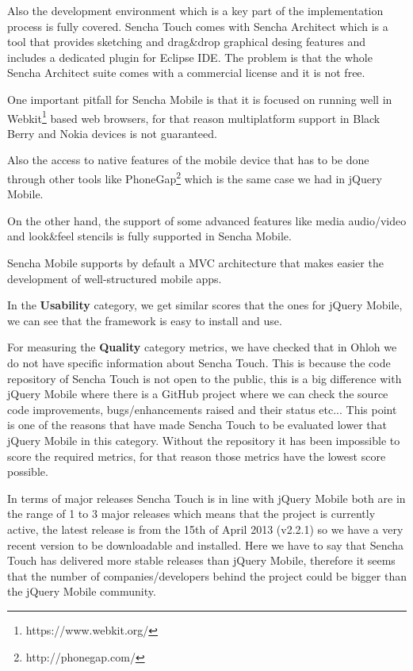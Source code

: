 \documentclass[a4paper,12pt]{book}
\begin{document}
Also the development environment which is a key part of the implementation process is fully covered. Sencha Touch comes with Sencha Architect\cite{sencha Architect} which is a tool that provides sketching and drag\&drop graphical desing features and includes a dedicated plugin for Eclipse IDE\cite{sencha Eclipse Plugin}. The problem is that the whole Sencha Architect suite comes with a commercial license and it is not free.

One important pitfall for Sencha Mobile is that it is focused on running well in Webkit\footnote{https://www.webkit.org/}  based web browsers, for that reason multiplatform support in Black Berry and Nokia devices is not guaranteed.

Also the access to native features of the mobile device that has to be done through other tools like PhoneGap\footnote{http://phonegap.com/} which is the same case we had in jQuery Mobile. 

On the other hand, the support of some advanced features like media audio/video and look\&feel stencils is fully supported in Sencha Mobile.

Sencha Mobile supports by default a MVC architecture\cite{sencha MVC}  that makes easier the development of well-structured mobile apps.

In the \textbf{Usability} category, we get similar scores that the ones for jQuery Mobile, we can see that the framework is easy to install and use.

For measuring the \textbf{Quality} category metrics, we have checked that in Ohloh we do not have specific information about Sencha Touch\cite{Ohloh Sencha Touch}. This is because the code repository of Sencha Touch is not open to the public, this is a big difference with jQuery Mobile where there is a GitHub project where we can check the source code improvements, bugs/enhancements raised and their status etc... This point is one of the reasons that have made Sencha Touch to be evaluated lower that jQuery Mobile in this category. Without the repository it has been impossible to score the required metrics, for that reason those metrics have the lowest score possible.

In terms of major releases Sencha Touch is in line with jQuery Mobile both are in the range of 1 to 3 major releases which means that the project is currently active, the latest release is from the 15th of April 2013 (v2.2.1) so we have a very recent version to be downloadable and installed. Here we have to say that Sencha Touch has delivered more stable releases than jQuery Mobile, therefore it seems that the number of companies/developers behind the project could be bigger than the jQuery Mobile community.
\end{document}
